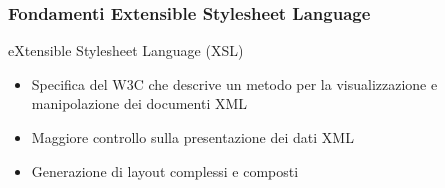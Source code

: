     

    



\begin{frame}
    \frametitle{Fondamenti Extensible Stylesheet Language}
    \addtocounter{nframe}{1}
    

     \begin{block}{eXtensible Stylesheet Language (XSL)}
         \begin{itemize}
            \item  Specifica del W3C che descrive un metodo per la visualizzazione e manipolazione dei documenti XML
             \item Maggiore controllo sulla presentazione dei dati XML
             \item Generazione di layout complessi e composti
        \end{itemize}
     \end{block}
    
\end{frame}


